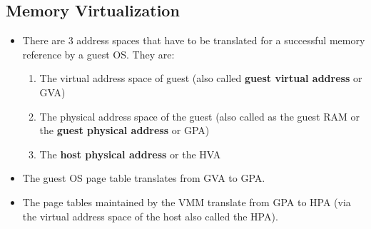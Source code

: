 \documentclass{article}
\begin{document}
\subsection{Memory Virtualization}
\begin{itemize}
    \item There are 3 address spaces that have to be translated for a successful memory reference by a guest OS. They are:
    \begin{enumerate}
        \item The virtual address space of guest (also called \textbf{guest virtual address} or GVA)
        
        \item The physical address space of the guest (also called as the guest RAM or the \textbf{guest physical address} or GPA)
        
        \item The \textbf{host physical address} or the HVA
    \end{enumerate}
    
    \item The guest OS page table translates from GVA to GPA.
    
    \item The page tables maintained by the VMM translate from GPA to HPA (via the virtual address space of the host also called the HPA). 
\end{itemize}
\end{document}
